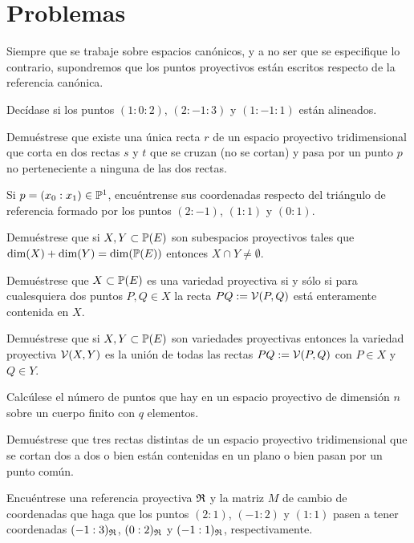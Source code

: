 \section{Problemas}
Siempre que se trabaje sobre espacios canónicos, y a no ser que se especifique lo contrario, supondremos que los puntos proyectivos están escritos respecto de la referencia canónica.
\begin{prob}
	Decídase si los puntos $(1:0:2)$, $(2:-1:3)$ y $(1:-1:1)$ están alineados.
\end{prob}
\begin{prob}
	Demuéstrese que existe una única recta $r$ de un espacio proyectivo tridimensional que corta en dos rectas $s$ y $t$ que se cruzan (no se cortan) y pasa por un punto $p$ no perteneciente a ninguna de las dos rectas.
\end{prob}
\begin{prob}
	Si $p=(x_0:x_1)\in\mathbb{P}^1$, encuéntrense sus coordenadas respecto del triángulo de referencia formado por los puntos $(2:-1)$, $(1:1)$ y $(0:1)$.
\end{prob}
\begin{prob}
	Demuéstrese que si $X,Y\subset\mathbb{P}(E)$ son subespacios proyectivos tales que $\dim(X) + \dim(Y) = \dim(\mathbb{P}(E))$ entonces $X\cap Y\not=\emptyset$.
\end{prob}
\begin{prob}
	Demuéstrese que $X\subset\mathbb{P}(E)$ es una variedad proyectiva si y sólo si para cualesquiera dos puntos $P,Q\in X$ la recta $PQ:=\mathcal{V}(P,Q)$ está enteramente contenida en $X$.
\end{prob}
\begin{prob}
	Demuéstrese que si $X,Y\subset \mathbb{P}(E)$ son variedades proyectivas entonces la variedad proyectiva $\mathcal{V}(X,Y)$ es la unión de todas las rectas $PQ:=\mathcal{V}(P,Q)$ con $P\in X$ y $Q\in Y$.
\end{prob}
\begin{prob}
	Calcúlese el número de puntos que hay en un espacio proyectivo de dimensión $n$ sobre un cuerpo finito con $q$ elementos.
\end{prob}
\begin{prob}
	Demuéstrese que tres rectas distintas de un espacio proyectivo tridimensional que se cortan dos a dos o bien están contenidas en un plano o bien pasan por un punto
	común.
\end{prob}
\begin{prob}
	Encuéntrese una referencia proyectiva $\mathfrak{R}$ y la matriz $M$ de cambio de coordenadas que haga que los puntos $(2:1)$, $(-1:2)$ y $(1:1)$ pasen a tener
	coordenadas $(-1:3)_{\mathfrak{R}}$, $(0:2)_{\mathfrak{R}}$ y $(-1:1)_{\mathfrak{R}}$, respectivamente.
\end{prob}
